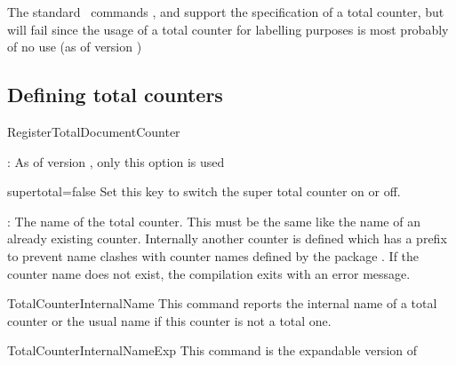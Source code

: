 \documentclass[12pt,a4paper,oneside]{article}
\makeatletter
\newcommand{\chdocextractversion}[1]{%
  \@nameuse{#1}%
}
\newcommand{\CHDocNew}[1]{%
  \tcbdocmarginnote[doclang/new={N},
  colframe=blue,
  halign=left,
  colback={blue!20!white},
  fontupper={\tiny}
  ]{%
    \chdocextractversion{xassoccntversion#1}%
  }%
}
\newcommand{\CHDocExpCommand}[1][Expandable]{%
  \tcbdocmarginnote[doclang/new={N},
  colframe=green!50!blue,
  halign=left,
  colback={green!90!blue},
  fontupper={\tiny}
  ]{%
    #1%
  }%
}
\def\packageversion{\xassoccntpackageversion}%
\makeatother
\begin{document}
\begin{marker}
\tcbdocmarginnote{\bcbombe}The standard \LaTeXe\ commands ,  and  support the specification of a total counter, but  will fail since the usage of a total counter for labelling purposes is most probably of no use (as of version \packageversion)
\end{marker}

\subsection{Defining total counters}

\begin{docCommand}{RegisterTotalDocumentCounter}{}\CHDocNew{0.5}
\begin{codeoptionsenum}
  \item {}: As of version \packageversion, only this option is used
    \begin{docKey}{supertotal}{=}{false}
      Set this key to switch the super total counter on or off. 
    \end{docKey}
    \item {}: The name of the total counter. This must be the same like the name of an already existing counter. Internally another counter is defined which has a prefix to prevent name clashes with counter names defined by the package . If the counter name does not exist, the compilation exits with an error message. 
\end{codeoptionsenum}


\end{docCommand}




\begin{docCommand}{TotalCounterInternalName}{}
This command reports the internal name of a total counter or the usual name if this counter is not a total one. 
\end{docCommand}

\begin{dispExample}

\end{dispExample}

\begin{docCommand}[before={\CHDocExpCommand\par\CHDocNew{1.0}}]{TotalCounterInternalNameExp}{}
This command is the expandable version of 
\end{docCommand}
\end{document}
